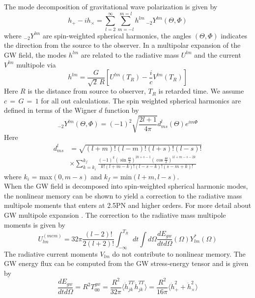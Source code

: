 \documentclass[prd,preprintnumbers,twocolumn,eqsecnum,floatfix,letter]{revtex4}
\begin{document}
The mode decomposition of gravitational wave polarization is given by
\begin{equation}\label{eq:2.1}
	h_+ - \mathit{i}h_{\times} = \sum_{l=2}^{\infty}\sum_{m=-l}^{m=l}h^{lm} \,  _{-2}Y^{lm}(\Theta, \Phi)
\end{equation}
where $_{-2}Y^{lm}$ are spin-weighted spherical harmonics, the angles $(\Theta, \Phi)$ indicates the direction from the source to the observer. In a multipolar expansion of the GW field, the modes $h^{lm}$ are related to the radiative mass $U^{lm}$ and the current $V^{lm}$ multipole via
\begin{equation}\label{eq:2.2}
	h^{lm}= \frac{G}{\sqrt{2}\, R }\left[U^{lm}(T_R)-\frac{\mathit{i}}{c}V^{lm}(T_R)\right]
\end{equation}
Here $R$ is the distance from source to observer, $T_R$ is retarded time. We assume $c\,=\,G\,=\,1$ for all out calculations.
 The spin weighted spherical harmonics are defined in terms of the Wigner $d$ function by
\begin{equation}\label{eq:2.3}
	_{-2}Y^{lm}(\Theta, \Phi) = (-1)^2\sqrt{\frac{2l + 1}{4\pi}}d^{l}_{ms}(\Theta)e^{\mathit{i}m\Phi}
\end{equation} 
Here
\begin{align}\label{eq:2.4}
	d^{l}_{ms}&=\sqrt{(l+m)!(l-m)!(l+s)!(l-s)!}\\
	&\times \sum_{k=k_i}^{k_f}\frac{(-1)^k(\sin\frac{\Theta}{2})^{2k+s-1}(\cos\frac{\Theta}{2})^{1l+m-s-2k}}{k!(l+m-k)!(l-s-k)!(s-m+k)!}
\end{align}
where $k_i$ = max$(0, m-s)$ and $k_f$ = min$(l+m, l-s)$. \\
When the GW field is decomposed into spin-weighted spherical harmonic modes, the nonlinear memory can be shown to yield a correction to the radiative mass multipole moments that enters at 2.5PN and higher orders. For more detail about GW multipole expansion \cite{Thorne1980}. The correction to the radiative mass multipole moments is given by
\begin{equation}\label{eq:2.6}
	U^{(mem)}_{lm}=32\pi\frac{(l-2)!}{2(l+2)!}\int_{-\infty}^{T_R}dt\int d\Omega\frac{dE_{gw}}{dtd\Omega}(\Omega)Y^*_{lm}(\Omega)
\end{equation}
The radiative current moments $V_{lm}$ do not contribute to nonlinear memory. The GW energy flux can be computed from the GW stress-energy tensor and is given by \cite{Favata2010}
\begin{equation}\label{eq:2.7}
	\frac{dE_{gw}}{dtd\Omega} = R^2 T^{gw}_{00} = \frac{R^2}{32\pi}\langle\dot{h}^{TT}_{jk}\dot{h}^{TT}_{jk}\rangle =\frac{R^2}{16\pi}\langle\dot{h}^2_{+}+ \dot{h}^2_{\times}\rangle
\end{equation}
\end{document}
